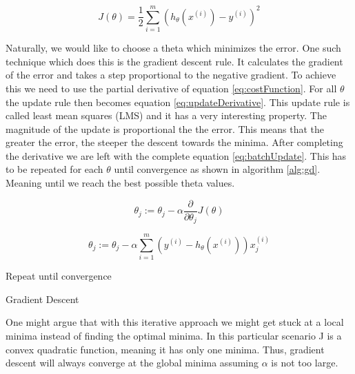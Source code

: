 \documentclass{mproj}
\begin{document}
\begin{equation}
\label{eq:costFunction}
J(\theta) = \frac{1}{2}\sum_{i=1}^{m}( h_\theta(x^{(i)})-y^{(i)})^2
\end{equation}

Naturally, we would like to choose a theta which minimizes the error. One such technique which does this is the gradient descent rule. It calculates the gradient of the error and takes a step proportional to the negative gradient. To achieve this we need to use the partial derivative of equation \ref{eq:costFunction}. For all $\theta$ the update rule then becomes equation \ref{eq:updateDerivative}. This update rule is called least mean squares (LMS) and it has a very interesting property. The magnitude of the update is proportional the the error. This means that the greater the error, the steeper the descent towards the minima.  After completing the derivative we are left with the complete equation \ref{eq:batchUpdate}. This has to be repeated for each $\theta$ until convergence as shown in algorithm \ref{alg:gd}. Meaning until we reach the best possible theta values.

\begin{equation}
\label{eq:updateDerivative}
\theta_j := \theta_j - \alpha\frac{\partial}{\partial\theta_j}J(\theta)
\end{equation}

\begin{equation}
\label{eq:batchUpdate}
\theta_j := \theta_j - \alpha\sum_{i=1}^{m}(y^{(i)}-h_\theta(x^{(i)}))x_j^{(i)}
\end{equation}

\begin{algorithm}[H]
Repeat until convergence\;
\caption{Gradient Descent}
\label{alg:gd}
\end{algorithm}

One might argue that with this iterative approach we might get stuck at a local minima instead of finding the optimal minima. In this particular scenario J is a convex quadratic function, meaning it has only one minima. Thus, gradient descent will always converge at the global minima assuming $\alpha$ is not too large.
\end{document}
